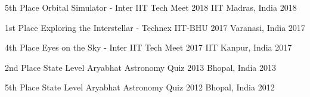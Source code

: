 













\begin{cvhonors}


\cvhonor
{5th Place} %
{Orbital Simulator - Inter IIT Tech Meet 2018} %
{IIT Madras, India} %
{2018} %


\cvhonor
{1st Place} %
{Exploring the Interstellar - Technex IIT-BHU 2017} %
{Varanasi, India} %
{2017} %


\cvhonor
{4th Place} %
{Eyes on the Sky - Inter IIT Tech Meet 2017} %
{IIT Kanpur, India} %
{2017} %



\cvhonor
{2nd Place} %
{State Level Aryabhat Astronomy Quiz 2013} %
{Bhopal, India} %
{2013} %


\cvhonor
{5th Place} %
{State Level Aryabhat Astronomy Quiz 2012} %
{Bhopal, India} %
{2012} %



\end{cvhonors}